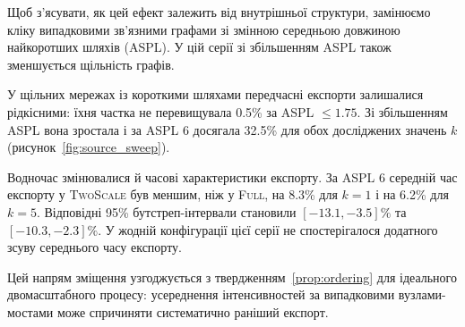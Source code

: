 \documentclass[a4paper,fleqn]{cas-sc}
\newcommand{\Full}{\textup{\textsc{Full}}}
\newcommand{\TS}{\textup{\textsc{TwoScale}}}
\begin{document}
Щоб з'ясувати, як цей ефект залежить
від внутрішньої структури, замінюємо
кліку випадковими зв'язними графами
зі змінною середньою довжиною
найкоротших шляхів (ASPL).
У цій серії зі збільшенням ASPL
також зменшується щільність графів.

У щільних мережах із короткими шляхами
передчасні експорти залишалися рідкісними:
їхня частка не перевищувала 0.5\%
за ASPL $\leq 1.75$.
Зі збільшенням ASPL вона зростала
і за ASPL 6 досягала 32.5\%
для обох досліджених значень $k$
(рисунок~\ref{fig:source_sweep}).

Водночас змінювалися й часові характеристики
експорту. За ASPL 6 середній час експорту
у \TS{} був меншим, ніж у \Full{},
на 8.3\% для $k=1$ і на 6.2\% для $k=5$.
Відповідні 95\% бутстреп-інтервали
становили $[-13.1,-3.5]\%$
та $[-10.3,-2.3]\%$.
У жодній конфігурації цієї серії
не спостерігалося додатного
зсуву середнього часу експорту.

Цей напрям зміщення узгоджується
з твердженням~\ref{prop:ordering}
для ідеального двомасштабного процесу:
усереднення інтенсивностей за випадковими
вузлами-мостами може спричиняти
систематично раніший експорт.
\end{document}
